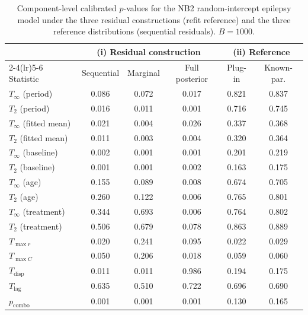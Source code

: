 \begin{table}[htbp]
\centering
\small
\caption{Component-level calibrated $p$-values for the NB2 random-intercept epilepsy model under the three residual constructions (refit reference) and the three reference distributions (sequential residuals). $B=1000$.}
\label{tab:ablation-epil-components}
\begin{tabular}{lccccc}
\toprule
 & \multicolumn{3}{c}{(i) Residual construction} & \multicolumn{2}{c}{(ii) Reference} \\
\cmidrule(lr){2-4}\cmidrule(lr){5-6}
Statistic & Sequential & Marginal & Full posterior & Plug-in & Known-par. \\
\midrule
$T_{\infty}$ (period) & 0.086 & 0.072 & 0.017 & 0.821 & 0.837 \\
$T_{2}$ (period) & 0.016 & 0.011 & 0.001 & 0.716 & 0.745 \\
$T_{\infty}$ (fitted mean) & 0.021 & 0.004 & 0.026 & 0.337 & 0.368 \\
$T_{2}$ (fitted mean) & 0.011 & 0.003 & 0.004 & 0.320 & 0.364 \\
$T_{\infty}$ (baseline) & 0.002 & 0.001 & 0.001 & 0.201 & 0.219 \\
$T_{2}$ (baseline) & 0.001 & 0.001 & 0.002 & 0.163 & 0.175 \\
$T_{\infty}$ (age) & 0.155 & 0.089 & 0.008 & 0.674 & 0.705 \\
$T_{2}$ (age) & 0.260 & 0.122 & 0.006 & 0.765 & 0.801 \\
$T_{\infty}$ (treatment) & 0.344 & 0.693 & 0.006 & 0.764 & 0.802 \\
$T_{2}$ (treatment) & 0.506 & 0.679 & 0.078 & 0.863 & 0.889 \\
$T_{\max r}$ & 0.020 & 0.241 & 0.095 & 0.022 & 0.029 \\
$T_{\max C}$ & 0.050 & 0.206 & 0.018 & 0.059 & 0.060 \\
$T_{\mathrm{disp}}$ & 0.011 & 0.011 & 0.986 & 0.194 & 0.175 \\
$T_{\mathrm{lag}}$ & 0.635 & 0.510 & 0.722 & 0.696 & 0.690 \\
\midrule
$p_{\mathrm{combo}}$ & 0.001 & 0.001 & 0.001 & 0.130 & 0.165 \\
\bottomrule
\end{tabular}
\end{table}
